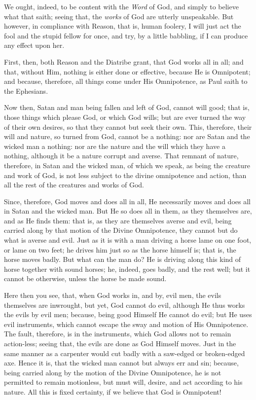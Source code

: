 We ought, indeed, to be content with the \emph{Word } of God, and simply to believe what that saith; seeing that, the \emph{works }of God are utterly unspeakable. But however, in compliance with Reason, that is, human foolery, I will just act the fool and the stupid fellow for once, and try, by a little babbling, if I can produce any effect upon her.

First, then, both Reason and the Diatribe grant, that God works all in all; and that, without Him, nothing is either done or effective, because He is Omnipotent; and because, therefore, all things come under His Omnipotence, as Paul saith to the Ephesians.

Now then, Satan and man being fallen and left of God, cannot will good; that is, those things which please God, or which God wills; but are ever turned the way of their own desires, so that they cannot but seek their own. This, therefore, their will and nature, so turned from God, cannot be a nothing: nor are Satan and the wicked man a nothing: nor are the nature and the will which they have a nothing, although it be a nature corrupt and averse. That remnant of nature, therefore, in Satan and the wicked man, of which we speak, as being the creature and work of God, is not less subject to the divine omnipotence and action, than all the rest of the creatures and works of God.

Since, therefore, God moves and does all in all, He necessarily moves and does all in Satan and the wicked man. But He so does all in them, as they themselves are, and as He finds them: that is, as they are themselves averse and evil, being carried along by that motion of the Divine Omnipotence, they cannot but do what is averse and evil. Just as it is with a man driving a horse lame on one foot, or lame on two feet; he drives him just so as the horse himself is; that is, the horse moves badly. But what can the man do? He is driving along this kind of horse together with sound horses; he, indeed, goes badly, and the rest well; but it cannot be otherwise, unless the horse be made sound.

Here then you see, that, when God works in, and by, evil men, the evils themselves are inwrought, but yet, God cannot do evil, although He thus works the evils by evil men; because, being good Himself He cannot do evil; but He uses evil instruments, which cannot escape the sway and motion of His Omnipotence. The fault, therefore, is in the instruments, which God allows not to remain action-less; seeing that, the evils are done as God Himself moves. Just in the same manner as a carpenter would cut badly with a saw-edged or broken-edged axe. Hence it is, that the wicked man cannot but always err and sin; because, being carried along by the motion of the Divine Omnipotence, he is not permitted to remain motionless, but must will, desire, and act according to his nature. All this is fixed certainty, if we believe that God is Omnipotent!

